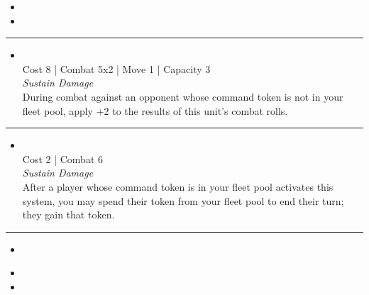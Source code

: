 \begin{multicols}{2}

\begin{itemize}
\item \biostims
\item \predictive
\end{itemize}

\vspace{-10pt}\rule{\hsize}{0.4pt}\vspace{5pt}


\begin{itemize}
\item {}\\
Cost 8 | Combat 5x2 | Move 1 | Capacity 3 \\
\emph{Sustain Damage}\\
During combat against an opponent whose command token is not in your fleet pool, apply +2 to the results of this unit's combat rolls.
\end{itemize}

\vspace{-10pt}\rule{\hsize}{0.4pt}\vspace{5pt}


\begin{itemize}
\item {}
\\
Cost 2 | Combat 6 \\
\emph{Sustain Damage}\\
After a player whose command token is in your fleet pool activates this system, you may spend their token from your fleet pool to end their turn; they gain that token.
\end{itemize}

\vspace{-10pt}\rule{\hsize}{0.4pt}\vspace{5pt}


\begin{itemize}
\item \legionnaireI
\end{itemize}

\columnbreak
{}

\begin{itemize}
\item \legionnaireII
\item \genetic
\end{itemize}


\end{multicols}
